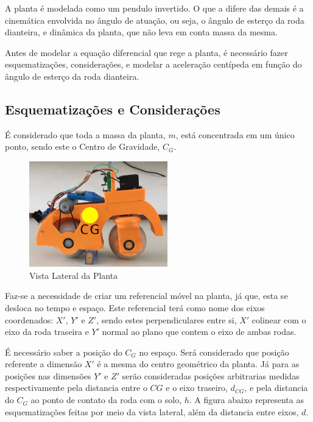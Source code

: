 \documentclass[conference,harvard,brazil,english]{sbatex}
\begin{document}
        A planta é modelada como um pendulo invertido. O que a difere das demais é a cinemática envolvida no ângulo de atuação, ou seja, o ângulo de esterço da roda dianteira, e dinâmica da planta, que não leva em conta massa da mesma.
        
         Antes de modelar a equação diferencial que rege a planta, é necessário fazer esquematizações, considerações, e modelar a aceleração centípeda em função do ângulo de esterço da roda dianteira.
        
        \subsection{Esquematizações e Considerações}
        
            É considerado que toda a massa da planta, $m$, está concentrada em um único ponto, sendo este o Centro de Gravidade, $C_G$.
            
            \begin{figure}[h]
                \centering
                \includegraphics[width=6cm]{imagens/planta/PlantaRealCG.jpg}
                \caption{Vista Lateral da Planta}
            \end{figure}
            
            Faz-se a necessidade de criar um referencial móvel na planta, já que, esta se desloca no tempo e espaço. Este referencial terá como nome dos eixos coordenados: $X'$, $Y'$ e $Z'$, sendo estes perpendiculares entre si, $X'$ colinear com o eixo da roda traseira e $Y'$ normal ao plano que contem o eixo de ambas rodas.
            
            É  necessário saber a posição do $C_G$ no espaço. Será considerado que posição referente a dimensão $X'$ é a mesma do centro geométrico da planta. Já para as posições nas dimensões $Y'$ e $Z'$ serão consideradas posições arbitrarias medidas respectivamente pela distancia entre o $CG$ e o eixo traseiro, $d_{CG}$, e pela  distancia do $C_G$ ao ponto de contato da roda com o solo, $h$. A figura abaixo representa as esquematizações feitas por meio da vista lateral, além da distancia entre eixos, $d$.
            
\end{document}
